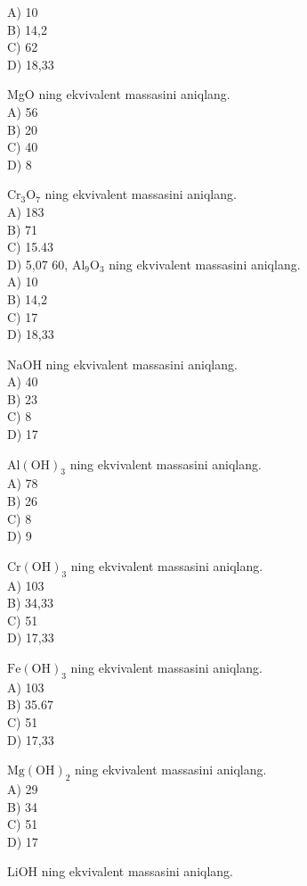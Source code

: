 A) 10\\
B) 14,2\\
C) 62\\
D) 18,33
  \item MgO ning ekvivalent massasini aniqlang.\\
A) 56\\
B) 20\\
C) 40\\
D) 8
  \item $\mathrm{Cr}_{3} \mathrm{O}_{7}$ ning ekvivalent massasini aniqlang.\\
A) 183\\
B) 71\\
C) 15.43\\
D) 5,07
60, $\mathrm{Al}_{9} \mathrm{O}_{3}$ ning ekvivalent massasini aniqlang.\\
A) 10\\
B) 14,2\\
C) 17\\
D) 18,33
  \item NaOH ning ekvivalent massasini aniqlang.\\
A) 40\\
B) 23\\
C) 8\\
D) 17\\
  \item $\mathrm{Al}(\mathrm{OH})_{3}$ ning ekvivalent massasini aniqlang.\\
A) 78\\
B) 26\\
C) 8\\
D) 9
  \item $\mathrm{Cr}(\mathrm{OH})_{3}$ ning ekvivalent massasini aniqlang.\\
A) 103\\
B) 34,33\\
C) 51\\
D) 17,33
  \item $\mathrm{Fe}(\mathrm{OH})_{3}$ ning ekvivalent massasini aniqlang.\\
A) 103\\
B) 35.67\\
C) 51\\
D) 17,33
  \item $\mathrm{Mg}(\mathrm{OH})_{2}$ ning ekvivalent massasini aniqlang.\\
A) 29\\
B) 34\\
C) 51\\
D) 17
  \item LiOH ning ekvivalent massasini aniqlang.\\
